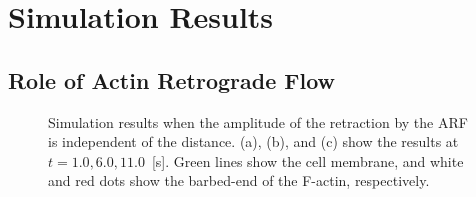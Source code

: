 \documentclass[a4paper,12pt, oneside]{book}
\begin{document}
\section{Simulation Results}
\subsection{Role of Actin Retrograde Flow}
\begin{figure}[tbp]
 \caption{Simulation results when the amplitude of the retraction by the ARF is independent of the distance. (a), (b), and (c) show the results at $t = 1.0, 6.0, 11.0$~[s]. Green lines show the cell membrane, and white and red dots show the barbed-end of the F-actin, respectively.}
 \label{fig:res0}
\end{figure}
\end{document}
